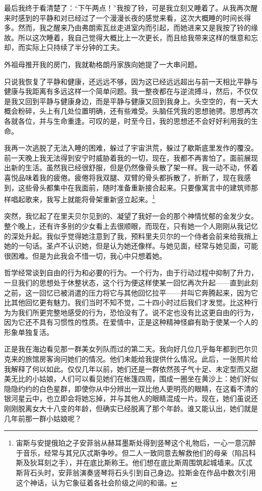 \par 最后我终于看清楚了：“下午两点！”我按了铃，可是我立刻又睡着了。从我再次醒来时感到的平静和对已经过了一个漫漫长夜的感觉来看，这次大概睡的时间长得多。然而，我之醒来乃由弗朗索瓦丝走进室内而引起，而她进来又是我按了铃的缘故。所以这次睡着，我自己觉得大概比上一次更长，而且给我带来这样的惬意和忘却，而实际上只持续了半分钟的工夫。
\par 外祖母推开我的房门，我就勒格朗丹家族向她提了一大串问题。
\par 只说我恢复了平静和健康，还远远不够，因为这已经远远超出与前一天相比平静与健康与我距离有多远这样一个简单问题。我一整夜都在与逆流搏斗，然后，不仅仅是我又回到平静与健康身边，而是平静与健康又回到我身上。头空空的，有一天大概会粉碎，头上有几处位置明确，还有些难受。头脑任凭我的思想驰骋。思想再次各就各位，并与生命重逢。可叹的是，时至今日，我的思想还不会好好利用我的生命。
\par 我再一次逃脱了无法入睡的困难，躲过了宇宙洪荒，躲过了歇斯底里发作的覆没。前一天晚上我无法得到安宁时威胁着我的一切，现在，我都不再害怕了。面前展现出新的生活。虽然我已经很舒服，但是仍然像骨头散了架一样。我一动不动，怀着喜悦品味着我的疲倦。疲倦将我双腿、双臂的骨头都拆散了，折断了，现在我感到，这些骨头都集中在我面前，随时准备重新接合起来。只要像寓言中的建筑师那样唱起歌来，我写上就能将骨架重新竖立起来。\footnote{宙斯与安提俄珀之子安菲翁从赫耳墨斯处得到竖琴这个礼物后，一心一意沉醉于音乐，经常与其兄仄忒斯争吵。但二人一致同意去解救他们的母亲（陷吕科斯及狄耳刻之手），并在底比斯称王。他们想在底比斯周围筑起城墙来。仄忒斯背石头时，安菲翁演奏竖琴将石头引到自己身边。拉斯金在作品中数次引用这个神话，认为它象征着各社会阶级之间的和谐。}
\par 突然，我忆起了在里夫贝尔见到的、凝望了我好一会的那个神情忧郁的金发少女。整个晚上，还有许多别的少女看上去很顺眼，而现在，只有她一个人刚刚从我记忆的深处升起。我似乎觉得她注意到了我，预料里夫贝尔的一个侍者会前来给我捎上她的一句话。圣卢不认识她，但是认为她还像样。与她见面，经常与她见面，可能很困难。但是为此我会不惜一切，我心中只想着她。
\par 哲学经常谈到自由的行为和必要的行为。一个行为，由于行动过程中抑制了升力，一旦我们的思想处于休整状态，这个行为便这样使某一回忆再次升起——直到此刻之前，这一回忆已被消遣的压力将它与其他回忆拉平——并叫它奔腾起来，因为它比其他回忆更有魅力。我们当时不知不觉，二十四小时过后我们才发觉。比这种行为为我们所更完整地感受的行为，恐怕没有了。说不定也没有比这更自由的行为，因为它还不具有习惯性的性质。在爱情中，正是这种精神怪癖有助于使某一个人的形象单独复活。
\par 正是我在海边看见那一群美女列队而过的第二天。我向好几位几乎每年都到巴尔贝克来的旅馆房客询问她们的情况。他们未能给我提供什么情况。此后，一张照片给我解释了何以如此。仅仅几年以前，她们还是一群依然孩子气十足、未定型而又甜美无比的小姑娘，人们可以看见她们在帐篷四周，围成一圈坐在黄沙上：她们好似隐隐约约的白色星群，即使你从中分辨出一双比他人更明亮的眼睛，在这看不清的银河星云中，也立即会将她忘掉，并与其他人的眼睛混成一片。现在，她们虽说还刚刚脱离女大十八变的年龄，但确实已经脱离了那个年龄。谁又能认出，她们就是几年前那一群小姑娘呢？
